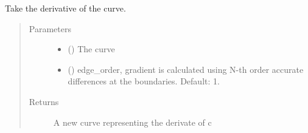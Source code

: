 \documentclass[letterpaper,10pt,english]{sphinxmanual}
\begin{document}
\begin{fulllineitems}
\label{\detokenize{pydv:pydvpy.derivative}}
Take the derivative of the curve.

\begin{sphinxVerbatim}[commandchars=\\\{\}]
  
\end{sphinxVerbatim}

\begin{sphinxVerbatim}[commandchars=\\\{\}]
  \PYG{p}{[}\PYG{p}{]}
\end{sphinxVerbatim}
\begin{quote}\begin{description}
\item[{Parameters}] \leavevmode\begin{itemize}
\item {} 
 ({\hyperref[\detokenize{pydv:curve.Curve}]{}}) \textendash{} The curve

\item {} 
 (\sphinxstyleliteralemphasis{\sphinxupquote{, }}) \textendash{} edge\_order, gradient is calculated using N-th order accurate differences at the boundaries.
Default: 1.

\end{itemize}

\item[{Returns}] \leavevmode
A new curve representing the derivate of c

\end{description}\end{quote}

\end{fulllineitems}

\end{document}
